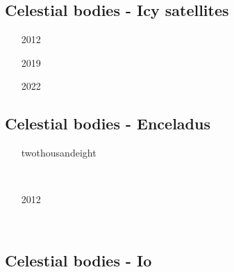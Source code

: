 \subsection{Celestial bodies - Icy satellites}

\begin{scriptsize}
\begin{itemize}
\item[2012] \textcite{kasc12b} \\
\item[2019] \textcite{wefb19} \\
\item[2022] \textcite{kibm22} \\
\end{itemize}
\end{scriptsize}

\subsection{Celestial bodies - Enceladus}

\begin{scriptsize}
\begin{itemize}
\item[twothousandeight] 
\textcite{roni08} \\
\item[\twothousandten]
\textcite{betc10} \\
\item[2012] 
\textcite{hats12} \\
\item[\twothousandfourteen]
\textcite{robg14} \\
\end{itemize}
\end{scriptsize}

\subsection{Celestial bodies - Io}

\begin{scriptsize}
\begin{itemize}
\item[\twothousandone]
\textcite{tasg01} \\
\textcite{tack01} \\
\end{itemize}
\end{scriptsize}


